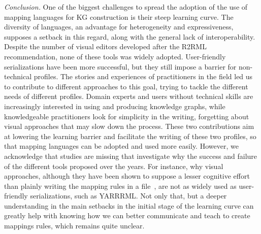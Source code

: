 \begin{itemize}
    \textit{Conclusion.} One of the biggest challenges to spread the adoption of the use of mapping languages for KG construction is their steep learning curve. The diversity of languages, an advantage for heterogeneity and expressiveness, supposes a setback in this regard, along with the general lack of interoperability. Despite the number of visual editors developed after the R2RML recommendation, none of these tools was widely adopted. User-friendly serializations have been more successful, but they still impose a barrier for non-technical profiles. 
    The stories and experiences of practitioners in the field led us to contribute to different approaches to this goal, trying to tackle the different needs of different profiles. 
    Domain experts and users without technical skills are increasingly interested in using and producing knowledge graphs, while knowledgeable practitioners look for simplicity in the writing, forgetting about visual approaches that may slow down the process.
    These two contributions aim at lowering the learning barrier and facilitate the writing of these two profiles, so that mapping languages can be adopted and used more easily. 
    However, we acknowledge that studies are missing that investigate why the success and failure of the different tools proposed over the years. 
    For instance, why visual approaches, although they have been shown to suppose a lesser cognitive effort than plainly writing the mapping rules in a file~\parencite{junior2018mental}, are not as widely used as user-friendly serializations, such as YARRRML. 
    Not only that, but a deeper understanding in the main setbacks in the initial stage of the learning curve can greatly help with knowing how we can better communicate and teach to create mappings rules, which remains quite unclear. 
\end{itemize}


